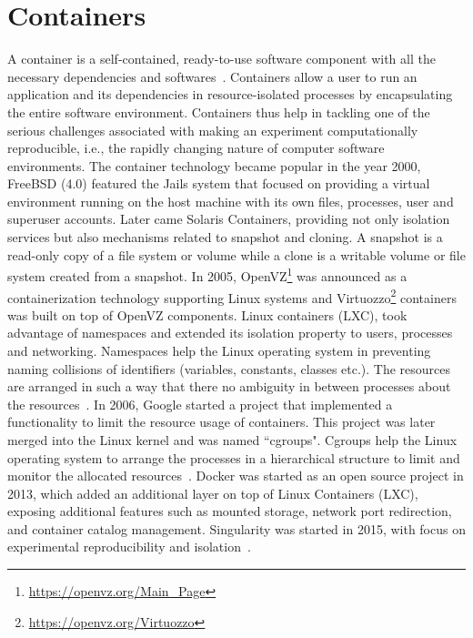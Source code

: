 \section{Containers}\label{containers}
A container is a self-contained, ready-to-use software component with all the necessary dependencies and softwares~\cite{7158965}. Containers allow a user to run an application and its dependencies in resource-isolated processes by encapsulating the entire software environment. Containers thus help in tackling one of the serious challenges associated with making an experiment computationally reproducible, i.e., the rapidly changing nature of computer software environments.
The container technology became popular in the year 2000, FreeBSD (4.0) featured the Jails system that focused on providing a virtual environment running on the host machine with its own files, processes, user and superuser accounts. Later came Solaris Containers, providing not only isolation services but also mechanisms related to snapshot and cloning. A snapshot is a read-only copy of a file system or volume while a clone is a writable volume or file system created from a snapshot. In 2005, OpenVZ\footnote{\url{https://openvz.org/Main_Page}} was announced as a containerization technology supporting Linux systems and Virtuozzo\footnote{\url{https://openvz.org/Virtuozzo}} containers was built on top of OpenVZ components. Linux containers (LXC), took advantage of namespaces and extended its isolation property to users, processes and networking.
Namespaces help the Linux operating system in preventing naming collisions of identifiers (variables, constants, classes etc.). The resources are arranged in such a way that there no ambiguity in between processes about the resources~\cite{namespaces}. In 2006, Google started a project that implemented a functionality to limit the resource usage of containers. This project was later merged into the Linux kernel and was named ``cgroups". Cgroups help the Linux operating system to arrange the processes in a hierarchical structure to limit and monitor the allocated resources~\cite{cgroups}. Docker was started as an open source project in 2013, which added an additional layer on top of Linux Containers (LXC), exposing additional features such as mounted storage, network port redirection, and container catalog management. Singularity was started in 2015, with focus on experimental reproducibility and isolation~\cite{Xavier:2013:PEC:2497369.2497577}.

